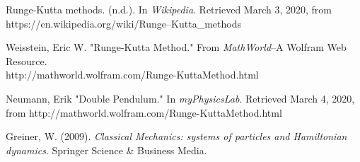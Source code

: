 \documentclass[12pt]{article}
\begin{document}
\begin{thebibliography}{}

 Runge-Kutta methods. (n.d.). In {\it Wikipedia}. Retrieved March 3, 2020, from https://en.wikipedia.org/wiki/Runge–Kutta\_methods

 Weisstein, Eric W. "Runge-Kutta Method." From {\it MathWorld}--A Wolfram Web Resource.\\ 
http://mathworld.wolfram.com/Runge-KuttaMethod.html

 Neumann, Erik "Double Pendulum." In {\it myPhysicsLab}. Retrieved March 4, 2020, from http://mathworld.wolfram.com/Runge-KuttaMethod.html

 Greiner, W. (2009). \emph{Classical Mechanics: systems of particles and Hamiltonian dynamics}. Springer Science \& Business Media.
 
\end{thebibliography}
\end{document}
